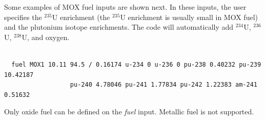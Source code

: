 Some examples of MOX fuel inputs are shown next. In these inputs, the user specifies
the $^{235}$U enrichment (the $^{235}$U enrichment is usually small in MOX fuel) and the
plutonium isotope enrichments. The code will automatically add $^{234}$U, $^{236}$U, $^{238}$U,
and oxygen.
\begin{Verbatim}[fontsize=\small]

  fuel MOX1 10.11 94.5 / 0.16174 u-234 0 u-236 0 pu-238 0.40232 pu-239 10.42187
                  pu-240 4.78046 pu-241 1.77834 pu-242 1.22383 am-241 0.51632

\end{Verbatim}

Only oxide fuel can be defined on the {\it fuel} input. Metallic fuel is not supported.
